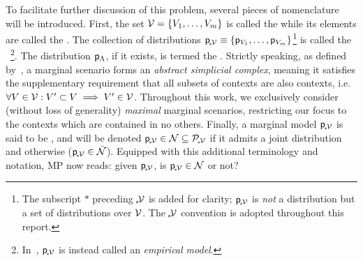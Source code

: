 \documentclass[aps, 10pt, english, twoside, twocolumn, pra, nofootinbib, tightenlines, longbibliography, superscriptaddress]{revtex4-1}
\begin{document}
    To facilitate further discussion of this problem, several pieces of nomenclature will be introduced. First, the set $\mscenario = \bc{V_1, \ldots, V_m}$ is called the  while its elements are called the . The collection of distributions $\prob{\mscenariowrap} \defined \bc{\prob{V_1},\ldots,\prob{V_m}}$\footnote{The subscript $*$ preceding $\!{}_*\!\mathcal{V}$ is added for clarity; ${\mathsf{p}}_{\!{}_*\!\mathcal{V}}$ is \textit{not} a distribution but a set of distributions over $\mathcal{V}$. The $\!{}_*\!\mathcal{V}$ convention is adopted throughout this report.} is called the ~\cite{Fritz_2011}\footnote{In~\cite{Abramsky_2011}, ${\mathsf{p}}_{\!{}_*\!\mathcal{V}}$ is instead called an \textit{empirical model}.}. The distribution ${\mathsf{p}}_{\Lambda}$, if it exists, is termed the . Strictly speaking, as defined by~\cite{Fritz_2011}, a marginal scenario forms an \textit{abstract simplicial complex}, meaning it satisfies the supplementary requirement that all subsets of contexts are also contexts, i.e. $\forall V \in \mathcal{V} : V' \subset V \implies V' \in \mathcal{V}$. Throughout this work, we exclusively consider (without loss of generality) \textit{maximal} marginal scenarios, restricting our focus to the contexts which are contained in no others. Finally, a marginal model ${\mathsf{p}}_{\!{}_*\!\mathcal{V}}$ is said to be , and will be denoted ${\mathsf{p}}_{\!{}_*\!\mathcal{V}} \in \mathcal{N} \subseteq \mathcal{P}_{\!{}_*\!\mathcal{V}}$ if it admits a joint distribution and  otherwise (${\mathsf{p}}_{\!{}_*\!\mathcal{V}} \in \bar{\mathcal{N}}$). Equipped with this additional terminology and notation, MP now reads: given ${\mathsf{p}}_{\!{}_*\!\mathcal{V}}$, is ${\mathsf{p}}_{\!{}_*\!\mathcal{V}} \in \mathcal{N}$ or not?
\end{document}
